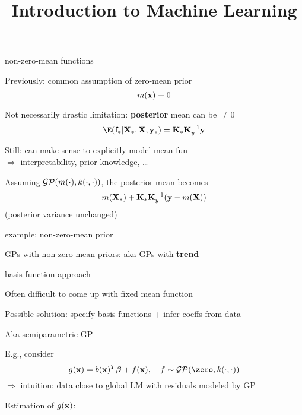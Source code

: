 \documentclass[11pt,compress,t,notes=noshow, xcolor=table]{beamer}
\title{Introduction to Machine Learning}
\begin{document}


\begin{framei}[sep=L]{non-zero-mean functions}
\item Previously: common assumption of zero-mean prior $$m(\mathbf{x}) \equiv 0$$
\item Not necessarily drastic limitation: \textbf{posterior} mean can be $\neq 0$
$$\E(\fstar | \Xstar, \Xmat, \ystar) = \Kstar \Ky^{-1} \yv$$
\item Still: can make sense to explicitly model mean fun \\$\Rightarrow$ interpretability, prior knowledge, \dots
\item Assuming $\mathcal{GP}(m(\cdot), k(\cdot, \cdot))$, the posterior mean becomes
$$m(\mathbf{X}_\ast) + \mathbf{K}_{\ast} \mathbf{K}_y^{-1} (\mathbf{y} - m(\mathbf{X}))$$
(posterior variance unchanged)
\end{framei}

\begin{framei}[sep=L]{example: non-zero-mean prior}
\item GPs with non-zero-mean priors: aka GPs with \textbf{trend}
\vfill
{}
\vfill
{}
\end{framei}

\begin{framei}[sep=L]{basis function approach}
\item Often difficult to come up with fixed mean function
\item Possible solution: specify basis functions + infer coeffs from data
\item Aka semiparametric GP
\item E.g., consider $$g(\xv) = b(\xv)^T\bm{\beta} + \fx, \quad f  \sim \gpzk$$
$\Rightarrow$ intuition: data close to global LM with residuals modeled by GP
\item Estimation of $g(\mathbf{x})$: 
\end{framei}

\endlecture
\end{document}
